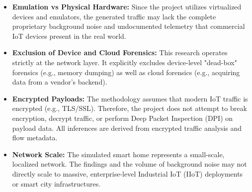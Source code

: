 \begin{itemize}
	\item \textbf{Emulation vs Physical Hardware:} Since the project utilizes virtualized devices and emulators, the generated traffic may lack the complete proprietary background noise and undocumented telemetry that commercial IoT devices present in the real world.
	\item \textbf{Exclusion of Device and Cloud Forensics:} This research operates strictly at the network layer. It explicitly excludes device-level "dead-box" forensics (e.g., memory dumping) as well as cloud forensics (e.g., acquiring data from a vendor's backend).
	\item \textbf{Encrypted Payloads:} The methodology assumes that modern IoT traffic is encrypted (e.g., TLS/SSL). Therefore, the project does not attempt to break encryption, decrypt traffic, or perform Deep Packet Inspection (DPI) on payload data. All inferences are derived from encrypted traffic analysis and flow metadata.
	\item \textbf{Network Scale:} The simulated smart home represents a small-scale, localized network. The findings and the volume of background noise may not directly scale to massive, enterprise-level Industrial IoT (IIoT) deployments or smart city infrastructures.
\end{itemize}

